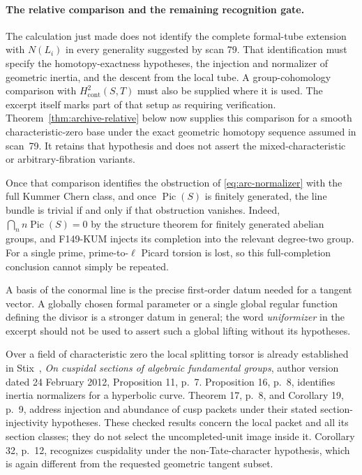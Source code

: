 \documentclass[11pt,a4paper]{article}
\theoremstyle{definition}
\begin{document}
\paragraph{The relative comparison and the remaining recognition gate.}
The calculation just made does not identify the complete formal-tube
extension with \(N(L_i)\) in every generality suggested by scan 79.
That identification must specify the homotopy-exactness hypotheses,
the injection and normalizer of geometric inertia, and the descent
from the local tube.  A group-cohomology comparison with
\(H^2_{\mathrm{cont}}(S,T)\) must also be supplied where it is used.
The excerpt itself marks part of that setup as requiring verification.
Theorem~\ref{thm:archive-relative} below now supplies this comparison for a smooth characteristic-zero base under the exact geometric homotopy sequence assumed in scan~79. It retains that hypothesis and does not assert the mixed-characteristic or arbitrary-fibration variants.

Once that comparison identifies the obstruction of
\eqref{eq:arc-normalizer} with the full Kummer Chern class, and once
\(\operatorname{Pic}(S)\) is finitely generated, the line bundle is
trivial if and only if that obstruction vanishes.  Indeed,
\(\bigcap_n n\operatorname{Pic}(S)=0\) by the structure theorem for
finitely generated abelian groups, and F149-KUM injects its completion
into the relevant degree-two group.  For a single prime, prime-to-\(\ell\)
Picard torsion is lost, so this full-completion conclusion cannot
simply be repeated.

A basis of the conormal line is the precise first-order datum needed
for a tangent vector.  A globally chosen formal parameter or a single
global regular function defining the divisor is a stronger datum in
general; the word \emph{uniformizer} in the excerpt should not be used
to assert such a global lifting without its hypotheses.

Over a field of characteristic zero the local splitting torsor is
already established in Stix~\cite{StixCuspidal2012}, \emph{On cuspidal sections of algebraic
fundamental groups}, author version dated 24 February 2012,
Proposition 11, p.~7.  Proposition 16, p.~8, identifies inertia
normalizers for a hyperbolic curve.  Theorem 17, p.~8, and Corollary 19,
p.~9, address injection and abundance of cusp packets under their
stated section-injectivity hypotheses.  These checked results concern
the local packet and all its section classes; they do not select the
uncompleted-unit image inside it.  Corollary 32, p.~12, recognizes
cuspidality under the non-Tate-character hypothesis, which is again
different from the requested geometric tangent subset.
\end{document}
